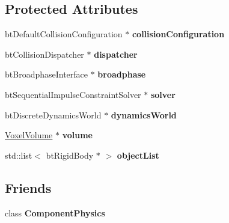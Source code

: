 \subsection*{\-Protected \-Attributes}
\begin{DoxyCompactItemize}
\item 
\hypertarget{classPhysics_a5a82b789aed9986b2921b2fc33e3d1d7}{
bt\-Default\-Collision\-Configuration $\ast$ {\bfseries collision\-Configuration}}
\label{d4/d2d/classPhysics_a5a82b789aed9986b2921b2fc33e3d1d7}

\item 
\hypertarget{classPhysics_afa19fa215f96745d01f76da8273c1509}{
bt\-Collision\-Dispatcher $\ast$ {\bfseries dispatcher}}
\label{d4/d2d/classPhysics_afa19fa215f96745d01f76da8273c1509}

\item 
\hypertarget{classPhysics_a27a621d3ee9bc7f816d0c72a175751f9}{
bt\-Broadphase\-Interface $\ast$ {\bfseries broadphase}}
\label{d4/d2d/classPhysics_a27a621d3ee9bc7f816d0c72a175751f9}

\item 
\hypertarget{classPhysics_af9660444c78edf3c0f81070a6e803c48}{
bt\-Sequential\-Impulse\-Constraint\-Solver $\ast$ {\bfseries solver}}
\label{d4/d2d/classPhysics_af9660444c78edf3c0f81070a6e803c48}

\item 
\hypertarget{classPhysics_acc5baebffeedb496a9b25ed80a3e969c}{
bt\-Discrete\-Dynamics\-World $\ast$ {\bfseries dynamics\-World}}
\label{d4/d2d/classPhysics_acc5baebffeedb496a9b25ed80a3e969c}

\item 
\hypertarget{classPhysics_a85a4aec352eb9b30ed095df4dcde27b2}{
\hyperlink{classVoxelVolume}{\-Voxel\-Volume} $\ast$ {\bfseries volume}}
\label{d4/d2d/classPhysics_a85a4aec352eb9b30ed095df4dcde27b2}

\item 
\hypertarget{classPhysics_a8614dd49cb2d0bb49ca16029fbd79206}{
std\-::list$<$ bt\-Rigid\-Body $\ast$ $>$ {\bfseries object\-List}}
\label{d4/d2d/classPhysics_a8614dd49cb2d0bb49ca16029fbd79206}

\end{DoxyCompactItemize}
\subsection*{\-Friends}
\begin{DoxyCompactItemize}
\item 
\hypertarget{classPhysics_a1fea93fdcedfc99d5061d6904d6a93e6}{
class {\bfseries \-Component\-Physics}}
\label{d4/d2d/classPhysics_a1fea93fdcedfc99d5061d6904d6a93e6}

\end{DoxyCompactItemize}


